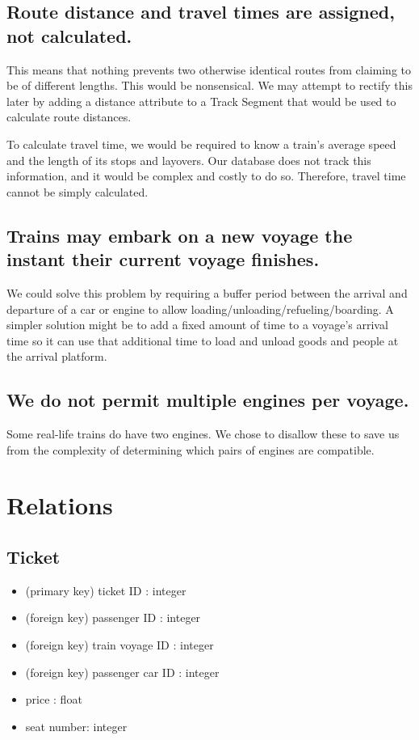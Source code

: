 \documentclass[a4paper]{article}
\begin{document}
\subsection*{Route distance and travel times are assigned, not calculated.}
This means that nothing prevents two otherwise identical routes from claiming to be of different lengths. This would be nonsensical. We may attempt to rectify this later by adding a distance attribute to a Track Segment that would be used to calculate route distances.

To calculate travel time, we would be required to know a train’s average speed and the length of its stops and layovers. Our database does not track this information, and it would be complex and costly to do so. Therefore, travel time cannot be simply calculated.	

\subsection*{Trains may embark on a new voyage the instant their current voyage finishes.}
We could solve this problem by requiring a buffer period between the arrival and departure of a car or engine to allow loading/unloading/refueling/boarding. A simpler solution might be to add a fixed amount of time to a voyage’s arrival time so it can use that additional time to load and unload goods and people at the arrival platform.

\subsection*{We do not permit multiple engines per voyage.}
Some real-life trains do have two engines. We chose to disallow these to save us from the complexity of determining which pairs of engines are compatible.


\section{Relations}
\subsection*{Ticket}
\begin{itemize}
\item (primary key) ticket ID : integer
\item (foreign key) passenger ID : integer
\item (foreign key) train voyage ID : integer
\item (foreign key) passenger car ID : integer
\item price : float
\item seat number: integer
\end{itemize}
\end{document}
